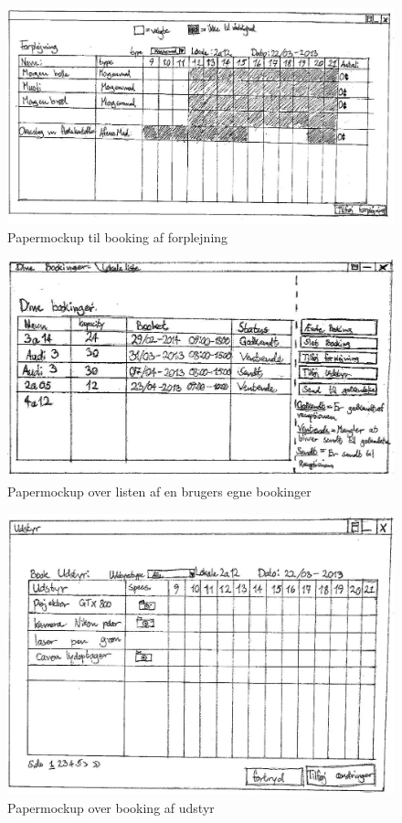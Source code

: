 \begin{figure}[h!]
  \centering
    \includegraphics[width=\textwidth]{Appendix/GUI-Prototype/PaperMockup/Forplejning_001}
  \caption{Papermockup til booking af forplejning}
\label{App_GUI_paper_Forplejning}
\end{figure}

\begin{figure}[h!]
  \centering
    \includegraphics[width=\textwidth]{Appendix/GUI-Prototype/PaperMockup/Dinebookinger_001}
  \caption{Papermockup over listen af en brugers egne bookinger}
\label{App_GUI_paper_DineBookinger}
\end{figure}

\begin{figure}[h!]
  \centering
    \includegraphics[width=\textwidth]{Appendix/GUI-Prototype/PaperMockup/BookUdstyr_001}
  \caption{Papermockup over booking af udstyr}
\label{App_GUI_paper_BookUdstyr}
\end{figure}

